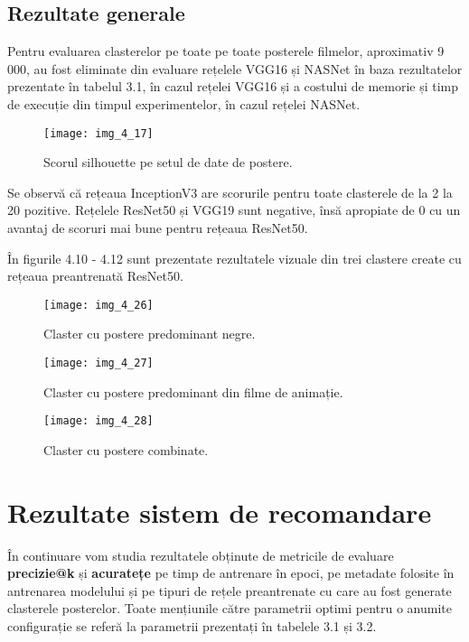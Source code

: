 \subsection{Rezultate generale}
Pentru evaluarea clasterelor pe toate pe toate posterele filmelor, aproximativ 9 000, au fost eliminate din evaluare rețelele VGG16 și NASNet în baza rezultatelor prezentate în tabelul 3.1, în cazul rețelei VGG16 și a costului de memorie și timp de execuție din timpul experimentelor, în cazul rețelei NASNet.
\begin{figure}[!h]
	\centering
	\texttt{[image: img\_4\_17]}
	\caption[Scorul silhouette pe setul de date de postere]{Scorul silhouette pe setul de date de postere.}
\end{figure} 
Se observă că rețeaua InceptionV3 are scorurile pentru toate clasterele de la 2 la 20 pozitive. Rețelele ResNet50 și VGG19 sunt negative, însă apropiate de 0 cu un avantaj de scoruri mai bune pentru rețeaua ResNet50.

În figurile 4.10 - 4.12 sunt prezentate rezultatele vizuale din trei clastere create cu rețeaua preantrenată ResNet50.
\begin{figure}[!h]
	\centering
	\texttt{[image: img\_4\_26]}
	\caption[Claster cu postere predominant negre]{Claster cu postere predominant negre.}
\end{figure} 
\begin{figure}[!h]
	\centering
	\texttt{[image: img\_4\_27]}
	\caption[Claster cu postere predominant din filme de animație]{Claster cu postere predominant din filme de animație.}
\end{figure} 
\begin{figure}[!h]
	\centering
	\texttt{[image: img\_4\_28]}
	\caption[Claster cu postere combinate]{Claster cu postere combinate.}
\end{figure} 

\section{Rezultate sistem de recomandare}
În continuare vom studia rezultatele obținute de metricile de evaluare \textbf{precizie@k} și \textbf{acuratețe} pe timp de antrenare în epoci, pe metadate folosite în antrenarea modelului și pe tipuri de rețele preantrenate cu care au fost generate clasterele posterelor. Toate mențiunile către parametrii optimi pentru o anumite configurație se referă la parametrii prezentați în tabelele 3.1 și 3.2.

